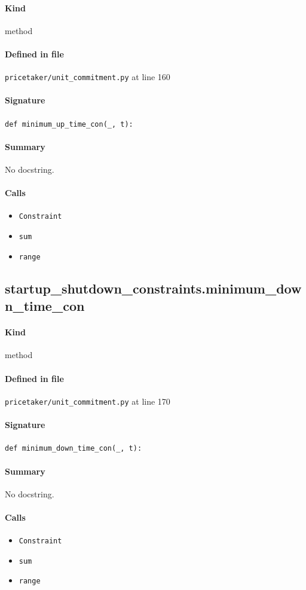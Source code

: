 \documentclass[11pt]{report}
\begin{document}
\paragraph{Kind} method
\paragraph{Defined in file} \texttt{pricetaker/unit\_commitment.py} at line 160
\paragraph{Signature} \texttt{def minimum\_up\_time\_con(\_, t):}
\paragraph{Summary} No docstring.
\paragraph{Calls}
\begin{itemize}[leftmargin=*]
  \item \texttt{Constraint}
  \item \texttt{sum}
  \item \texttt{range}
\end{itemize}
\subsection{startup\_shutdown\_constraints.minimum\_down\_time\_con}
\label{def:pricetaker-unit_commitment.py:startup_shutdown_constraints.minimum_down_time_con:L170}
\paragraph{Kind} method
\paragraph{Defined in file} \texttt{pricetaker/unit\_commitment.py} at line 170
\paragraph{Signature} \texttt{def minimum\_down\_time\_con(\_, t):}
\paragraph{Summary} No docstring.
\paragraph{Calls}
\begin{itemize}[leftmargin=*]
  \item \texttt{Constraint}
  \item \texttt{sum}
  \item \texttt{range}
\end{itemize}
\end{document}
